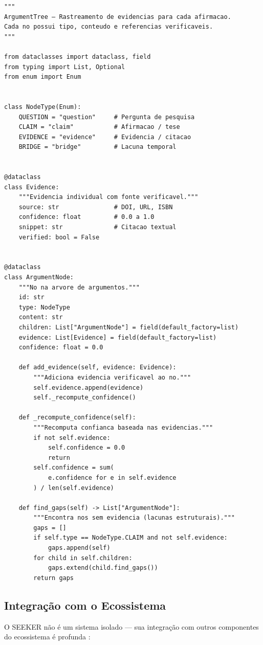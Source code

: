 \begin{lstlisting}[caption={argument\_tree.py — Arvore de Argumentos (abreviado)},
label={lst:argument-tree}, style=pythonstyle]
"""
ArgumentTree — Rastreamento de evidencias para cada afirmacao.
Cada no possui tipo, conteudo e referencias verificaveis.
"""

from dataclasses import dataclass, field
from typing import List, Optional
from enum import Enum


class NodeType(Enum):
    QUESTION = "question"     # Pergunta de pesquisa
    CLAIM = "claim"           # Afirmacao / tese
    EVIDENCE = "evidence"     # Evidencia / citacao
    BRIDGE = "bridge"         # Lacuna temporal


@dataclass
class Evidence:
    """Evidencia individual com fonte verificavel."""
    source: str               # DOI, URL, ISBN
    confidence: float         # 0.0 a 1.0
    snippet: str              # Citacao textual
    verified: bool = False


@dataclass
class ArgumentNode:
    """No na arvore de argumentos."""
    id: str
    type: NodeType
    content: str
    children: List["ArgumentNode"] = field(default_factory=list)
    evidence: List[Evidence] = field(default_factory=list)
    confidence: float = 0.0

    def add_evidence(self, evidence: Evidence):
        """Adiciona evidencia verificavel ao no."""
        self.evidence.append(evidence)
        self._recompute_confidence()

    def _recompute_confidence(self):
        """Recomputa confianca baseada nas evidencias."""
        if not self.evidence:
            self.confidence = 0.0
            return
        self.confidence = sum(
            e.confidence for e in self.evidence
        ) / len(self.evidence)

    def find_gaps(self) -> List["ArgumentNode"]:
        """Encontra nos sem evidencia (lacunas estruturais)."""
        gaps = []
        if self.type == NodeType.CLAIM and not self.evidence:
            gaps.append(self)
        for child in self.children:
            gaps.extend(child.find_gaps())
        return gaps
\end{lstlisting}

\subsection{Integração com o Ecossistema}

O SEEKER não é um sistema isolado — sua integração com outros
componentes do ecossistema é profunda \cite{opencode2026ecosystem,
opencode2026spec043}:

